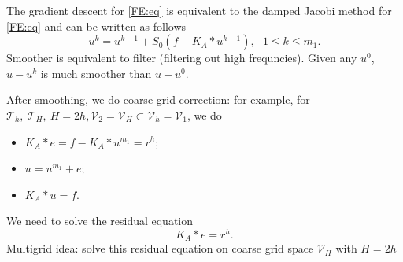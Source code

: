 The gradient descent for \eqref{FE:eq} is equivalent to the damped Jacobi method for \eqref{FE:eq} and can be written as follows 
$$
u^k=u^{k-1}+S_0(f-K_A\ast u^{k-1}),~~~1\le k\le m_1.
$$
Smoother  is equivalent to filter (filtering out high frequncies). Given any $u^0$, $u-u^k$ is much smoother than $u-u^0$. 


After smoothing, we do coarse grid correction: for example, for 
$\mathcal T_h,~\mathcal T_H,~H=2h, \mathcal V_2=\mathcal V_H\subset \mathcal V_h=\mathcal V_1$, we do
\begin{itemize}
\item $K_A\ast e=f- K_A\ast u^{m_1}=r^h$;
\item  $u=u^{m_1}+e$;
\item  $K_A\ast u=f$.
\end{itemize}
We need to solve the residual equation
$$
K_A\ast e=r^h.
$$
Multigrid idea: solve this residual  equation on coarse grid space $\mathcal V_H$ with $H=2h$ 

